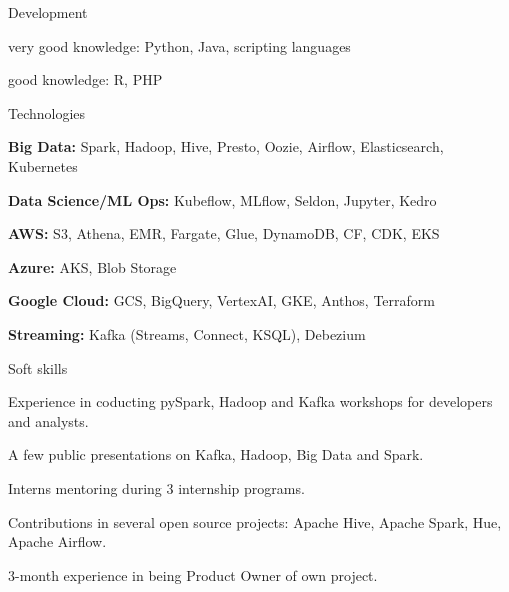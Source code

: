 

\begin{cventries}

  \cventry
    {Development} %
    {} %
    {} %
    {} %
    {
      \begin{cvitems} %
        \item {very good knowledge: Python, Java, scripting languages}
        \item {good knowledge: R, PHP}
      \end{cvitems}
    }
    
  \cventry
    {Technologies} %
    {} %
    {} %
    {} %
    {
      \begin{cvitems} %
        \item {\textbf{Big Data:} Spark, Hadoop, Hive, Presto, Oozie, Airflow, Elasticsearch, Kubernetes}
        \item {\textbf{Data Science/ML Ops:} Kubeflow, MLflow, Seldon, Jupyter, Kedro}
        \item {\textbf{AWS:} S3, Athena, EMR, Fargate, Glue, DynamoDB, CF, CDK, EKS}
        \item {\textbf{Azure:} AKS, Blob Storage}
        \item {\textbf{Google Cloud:} GCS, BigQuery, VertexAI, GKE, Anthos, Terraform}
        \item {\textbf{Streaming:} Kafka (Streams, Connect, KSQL), Debezium}
      \end{cvitems}
    }
    
  \cventry
    {Soft skills} %
    {} %
    {} %
    {} %
    {
      \begin{cvitems} %
        \item {Experience in coducting pySpark, Hadoop and Kafka workshops for developers and analysts.}
        \item {A few public presentations on Kafka, Hadoop, Big Data and Spark.}
        \item {Interns mentoring during 3 internship programs.}
        \item {Contributions in several open source projects: Apache Hive, Apache Spark, Hue, Apache Airflow.}
        \item{3-month experience in being Product Owner of own project.}
      \end{cvitems}
    }
    

\end{cventries}
